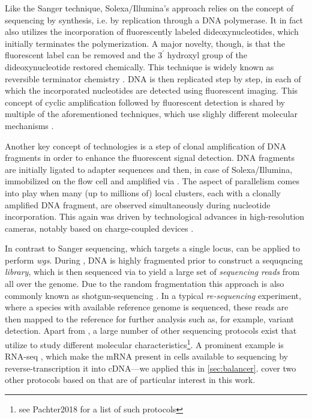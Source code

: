 Like the Sanger technique, Solexa/Illumina’s approach relies on the concept of
sequencing by synthesis, i.e. by replication through a DNA polymerase. It in
fact also utilizes the incorporation of fluorescently labeled dideoxynucleotides,
which initially terminates the polymerization. A major novelty, though, is that
the fluorescent label can be removed and the $3^\prime$ hydroxyl group of the
dideoxynucleotide restored chemically. This technique is widely known as
reversible terminator chemistry \citep{Turcatti2008}. DNA is then replicated
step by step, in each of which the incorporated nucleotides are detected using
fluorescent imaging. This concept of cyclic amplification followed by
fluorescent detection is shared by multiple of the aforementioned techniques,
which use slighly different molecular mechanisms \citep{Shendure2008}.

Another key concept of \mps technologies is a step of clonal amplification of
DNA fragments in order to enhance the fluorescent signal detection. DNA
fragments are initially ligated to adapter sequences and then, in case of
Solexa/Illumina, immobilized on the flow cell and amplified via
    \citep{Mullis1990}.
The aspect of parallelism comes into play when many (up to millions of) local
clusters, each with a clonally amplified DNA fragment, are observed
simultaneously during nucleotide incorporation. This again was driven by
technological advances in high-resolution cameras, notably based on
charge-coupled devices \citep{Barbe1975,Shendure2008}.


In contrast to Sanger sequencing, which targets a single locus, \mps can be
applied to perform \emph{\acf{wgs}}. During \wgs, DNA is highly fragmented prior
to construct a sequqncing \emph{library}, which is then sequenced via \mps to
yield a large set of \emph{sequencing reads} from
all over the genome. Due to the random fragmentation this approach is also
commonly known as shotgun-sequencing \citep{Weber1997}. In a typical
\emph{re-sequencing} experiment, where a species with available reference genome
is sequenced, these reads are then mapped to the reference for further analysis
such as, for example, variant detection. Apart from \wgs, a large number of
other sequencing protocols exist that utilize \mps to study different molecular
characteristics\footnote{see Pachter2018 for a list of such protocols}.
A prominent example is RNA-seq \citep{Morin2008,Wang2009},
which make the mRNA present in cells available to sequencing by
reverse-transcription it into cDNA---we applied this in \cref{sec:balancer}.
 cover two other protocols based on \mps that are
of particular interest in this work.

